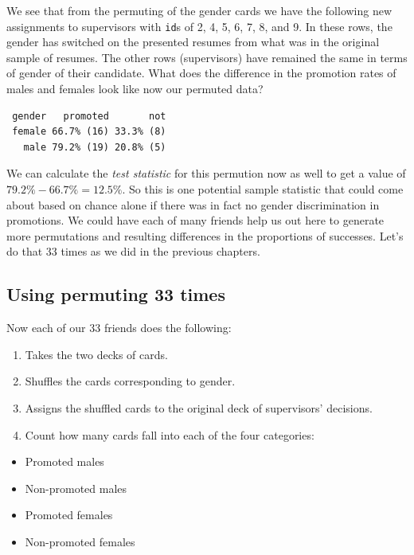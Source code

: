 \documentclass[12pt, krantz2,]{krantz}
\providecommand{\tightlist}{%
  \setlength{\itemsep}{0pt}\setlength{\parskip}{0pt}}
\begin{document}
We see that from the permuting of the gender cards we have the following new assignments to supervisors with \texttt{id}s of 2, 4, 5, 6, 7, 8, and 9. In these rows, the gender has switched on the presented resumes from what was in the original sample of resumes. The other rows (supervisors) have remained the same in terms of gender of their candidate. What does the difference in the promotion rates of males and females look like now our permuted data?

\begin{verbatim}
 gender   promoted       not
 female 66.7% (16) 33.3% (8)
   male 79.2% (19) 20.8% (5)
\end{verbatim}

We can calculate the \emph{test statistic} for this permution now as well to get a value of \(79.2\% - 66.7\% = 12.5\%\). So this is one potential sample statistic that could come about based on chance alone if there was in fact no gender discrimination in promotions. We could have each of many friends help us out here to generate more permutations and resulting differences in the proportions of successes. Let's do that 33 times as we did in the previous chapters.

\hypertarget{using-permuting-33-times}{%
\subsection{Using permuting 33 times}\label{using-permuting-33-times}}

Now each of our 33 friends does the following:

\begin{enumerate}
\def\labelenumi{\arabic{enumi}.}
\tightlist
\item
  Takes the two decks of cards.
\item
  Shuffles the cards corresponding to gender.
\item
  Assigns the shuffled cards to the original deck of supervisors' decisions.
\item
  Count how many cards fall into each of the four categories:
\end{enumerate}

\begin{itemize}
\tightlist
\item
  Promoted males
\item
  Non-promoted males
\item
  Promoted females
\item
  Non-promoted females
\end{itemize}
\end{document}
